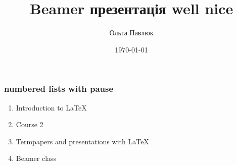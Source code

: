 \documentclass[12pt]{beamer}
\begin{document}
\title{Beamer презентація well nice}  
\author{Ольга Павлюк}
\date{\today} 

\begin{frame}
	\titlepage
\end{frame}

\begin{frame}\frametitle{numbered lists with pause}
	\begin{enumerate}
		\item Introduction to  \LaTeX \pause 
		\item Course 2 \pause 
		\item Termpapers and presentations with \LaTeX \pause 
		\item Beamer class
	\end{enumerate}
\end{frame}
\end{document}
